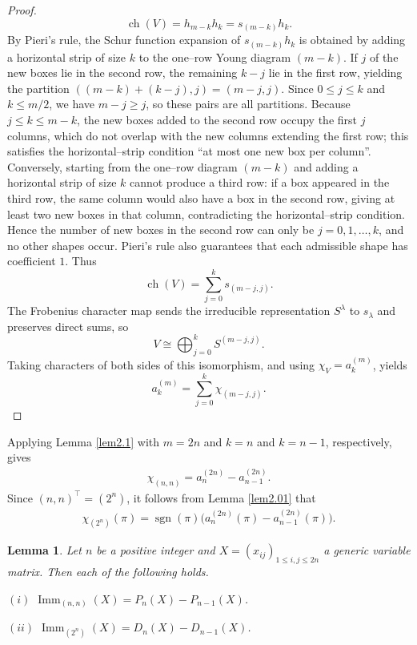 \documentclass[11pt,a4paper]{article}
\newtheorem{lemma}[theorem]{Lemma}
\begin{document}
\begin{proof}
\[
  \operatorname{ch}(V)=h_{m-k}h_k=s_{(m-k)}h_k.
\]
By Pieri's rule, the Schur function expansion of $s_{(m-k)}h_k$ is obtained by adding a horizontal strip of size $k$ to the one–row Young diagram $(m-k)$. If $j$ of the new boxes lie in the second row, the remaining $k-j$ lie in the first row, yielding the partition $((m-k)+(k-j),j)=(m-j,j)$. Since $0\leq j\leq k$ and $k\leq m/2$, we have $m-j\geq j$, so these pairs are all partitions. Because $j\leq k\leq m-k$, the new boxes added to the second row occupy the first $j$ columns, which do not overlap with the new columns extending the first row; this satisfies the horizontal–strip condition ``at most one new box per column''. Conversely, starting from the one–row diagram $(m-k)$ and adding a horizontal strip of size $k$ cannot produce a third row: if a box appeared in the third row, the same column would also have a box in the second row, giving at least two new boxes in that column, contradicting the horizontal–strip condition. Hence the number of new boxes in the second row can only be $j=0,1,\ldots,k$, and no other shapes occur. Pieri's rule also guarantees that each admissible shape has coefficient $1$. Thus
\[
  \operatorname{ch}(V)=\sum_{j=0}^{k}s_{(m-j,j)}.
\]
The Frobenius character map sends the irreducible representation $S^\lambda$ to $s_\lambda$ and preserves direct sums, so
\[
  V\cong\bigoplus_{j=0}^{k}S^{(m-j,j)}.
\]
Taking characters of both sides of this isomorphism, and using $\chi_V=a_k^{(m)}$, yields
\[
  a_k^{(m)}=\sum_{j=0}^{k}\chi_{(m-j,j)}.
\]
\end{proof}

Applying Lemma \ref{lem2.1} with $m=2n$ and $k=n$ and $k=n-1$, respectively, gives
\begin{eqnarray}\label{equ3}
  \chi_{{(n,n)}}=a_n^{(2n)}-a_{n-1}^{(2n)}.
\end{eqnarray}
Since $(n,n)^\top=(2^n)$, it follows from Lemma \ref{lem2.01} that
\begin{eqnarray}\label{equ4}
  \chi_{(2^n)}(\pi)
  =\operatorname{sgn}(\pi)\bigl(a_n^{(2n)}(\pi)-a_{n-1}^{(2n)}(\pi)\bigr).
\end{eqnarray}

\begin{lemma}\label{lem2.2}
Let $n$ be a positive integer and $X=(x_{ij})_{1\leq i,j\leq2n}$ a generic variable matrix. Then each of the following holds.

$(i)$ $\operatorname{Imm}_{(n,n)}(X)=P_n(X)-P_{n-1}(X)$.

$(ii)$  $\operatorname{Imm}_{(2^n)}(X)=D_n(X)-D_{n-1}(X)$.
\end{lemma}
\end{document}
